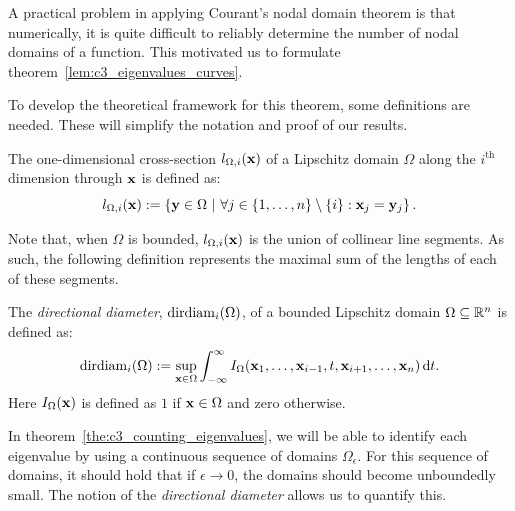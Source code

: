 A practical problem in applying Courant's nodal domain theorem is that numerically, it is quite difficult to reliably determine the number of nodal domains of a function. This motivated us to formulate theorem~\ref{lem:c3_eigenvalues_curves}.

To develop the theoretical framework for this theorem, some definitions are needed. These will simplify the notation and proof of our results.
\begin{definition}
  The one-dimensional cross-section $l_{\Omega,i}(\vb{x})$ of a Lipschitz domain $\Omega$ along the $i^\text{th}$ dimension through $\vb{x}$ is defined as:
  $$
    l_{\Omega,i}(\vb{x}) := \left\{\vb{y} \in \Omega \ |\  \forall j \in \{1, \dots, n\} \setminus \{i\} : \vb{x}_j = \vb{y}_j   \right\}\text{.}
  $$
\end{definition}

Note that, when $\Omega$ is bounded, $l_{\Omega,i}(\vb{x})$ is the union of collinear line segments. As such, the following definition represents the maximal sum of the lengths of each of these segments.

\begin{definition}
  The \emph{directional diameter}, $\operatorname{dirdiam}_i(\Omega)$, of a bounded Lipschitz domain $\Omega \subseteq \mathbb{R}^n$ is defined as:
  $$
    \operatorname{dirdiam}_i(\Omega) := \sup_{\vb{x}\in\Omega} \int_{-\infty}^{\infty} I_\Omega(\vb{x}_1, \dots, \vb{x}_{i-1}, t, \vb{x}_{i+1}, \dots, \vb{x}_n) \, \dd t \text{.}
  $$
  Here $I_\Omega(\vb{x})$ is defined as $1$ if $\vb{x} \in \Omega$ and zero otherwise.
\end{definition}

In theorem~\ref{the:c3_counting_eigenvalues}, we will be able to identify each eigenvalue by using a continuous sequence of domains $\Omega_\epsilon$. For this sequence of domains, it should hold that if $\epsilon \to 0$, the domains should become unboundedly small. The notion of the \emph{directional diameter} allows us to quantify this.

